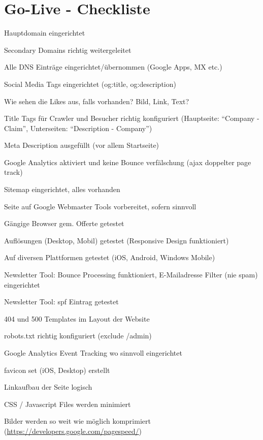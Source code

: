 
\section{Go-Live - Checkliste}
\label{sec:appendix_go_live_checkliste}
\begin{checklist}
  \item Hauptdomain eingerichtet
  \item Secondary Domains richtig weitergeleitet
  \item Alle DNS Einträge eingerichtet/übernommen (Google Apps, MX etc.)
  \item Social Media Tags eingerichtet (og:title, og:description)
  \item Wie sehen die Likes aus, falls vorhanden? Bild, Link, Text?
  \item Title Tags für Crawler und Besucher richtig konfiguriert (Hauptseite: ``Company - Claim'', Unterseiten: ``Description - Company'')
  \item Meta Description ausgefüllt (vor allem Startseite)
  \item Google Analytics aktiviert und keine Bounce verfälschung (ajax doppelter page track)
  \item Sitemap eingerichtet, alles vorhanden
  \item Seite auf Google Webmaster Tools vorbereitet, sofern sinnvoll
  \item Gängige Browser gem. Offerte getestet
  \item Auflösungen (Desktop, Mobil) getestet (Responsive Design funktioniert)
  \item Auf diversen Plattformen getestet (iOS, Android, Windows Mobile)
  \item Newsletter Tool: Bounce Processing funktioniert, E-Mailadresse Filter (nie spam) eingerichtet
  \item Newsletter Tool: spf Eintrag getestet
  \item 404 und 500 Templates im Layout der Website
  \item robots.txt richtig konfiguriert (exclude /admin)
  \item Google Analytics Event Tracking wo sinnvoll eingerichtet
  \item favicon set (iOS, Desktop) erstellt
  \item Linkaufbau der Seite logisch
  \item CSS / Javascript Files werden minimiert
  \item Bilder werden so weit wie möglich komprimiert (\url{https://developers.google.com/pagespeed/})

\end{checklist}
